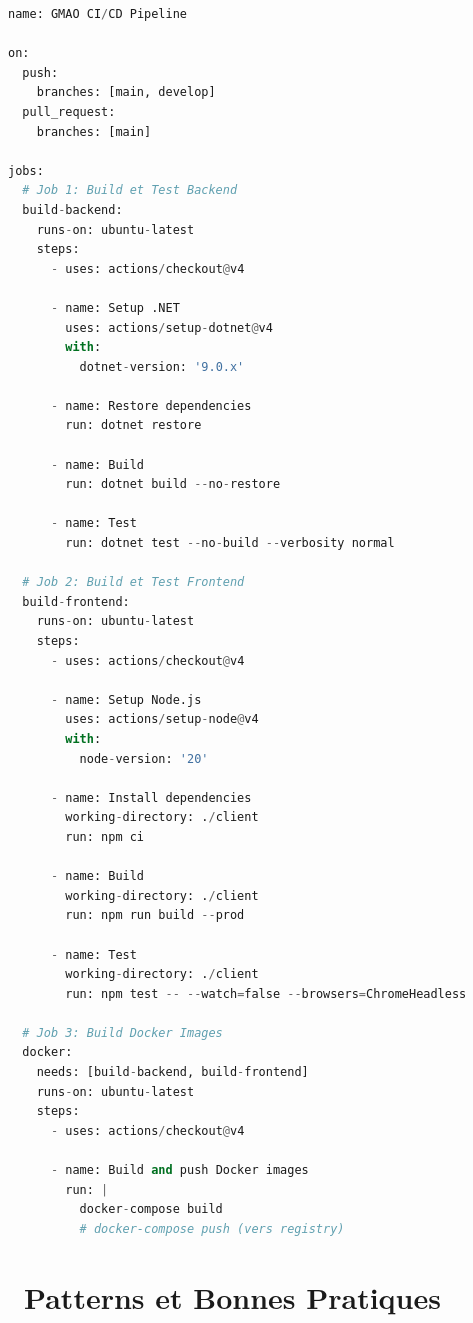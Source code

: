 \documentclass[12pt,a4paper]{article}
\begin{document}
\begin{lstlisting}[language=Python, caption=.github/workflows/ci-cd.yml (proposé)]
name: GMAO CI/CD Pipeline

on:
  push:
    branches: [main, develop]
  pull_request:
    branches: [main]

jobs:
  # Job 1: Build et Test Backend
  build-backend:
    runs-on: ubuntu-latest
    steps:
      - uses: actions/checkout@v4
      
      - name: Setup .NET
        uses: actions/setup-dotnet@v4
        with:
          dotnet-version: '9.0.x'
      
      - name: Restore dependencies
        run: dotnet restore
      
      - name: Build
        run: dotnet build --no-restore
      
      - name: Test
        run: dotnet test --no-build --verbosity normal

  # Job 2: Build et Test Frontend
  build-frontend:
    runs-on: ubuntu-latest
    steps:
      - uses: actions/checkout@v4
      
      - name: Setup Node.js
        uses: actions/setup-node@v4
        with:
          node-version: '20'
      
      - name: Install dependencies
        working-directory: ./client
        run: npm ci
      
      - name: Build
        working-directory: ./client
        run: npm run build --prod
      
      - name: Test
        working-directory: ./client
        run: npm test -- --watch=false --browsers=ChromeHeadless

  # Job 3: Build Docker Images
  docker:
    needs: [build-backend, build-frontend]
    runs-on: ubuntu-latest
    steps:
      - uses: actions/checkout@v4
      
      - name: Build and push Docker images
        run: |
          docker-compose build
          # docker-compose push (vers registry)
\end{lstlisting}

\newpage

\section{\faGraduationCap\ Patterns et Bonnes Pratiques}
\end{document}
